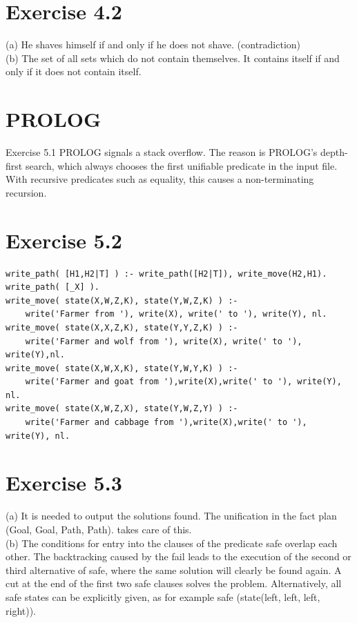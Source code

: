 \documentclass[10pt]{book}
\begin{document}
\section{Exercise 4.2}
(a) He shaves himself if and only if he does not shave. (contradiction)\\
(b) The set of all sets which do not contain themselves. It contains itself if and only if it does not contain itself.

\section{PROLOG}
Exercise 5.1 PROLOG signals a stack overflow. The reason is PROLOG's depth-first search, which always chooses the first unifiable predicate in the input file. With recursive predicates such as equality, this causes a non-terminating recursion.

\section{Exercise 5.2}
\begin{verbatim}
write_path( [H1,H2|T] ) :- write_path([H2|T]), write_move(H2,H1).
write_path( [_X] ).
write_move( state(X,W,Z,K), state(Y,W,Z,K) ) :-
    write('Farmer from '), write(X), write(' to '), write(Y), nl.
write_move( state(X,X,Z,K), state(Y,Y,Z,K) ) :-
    write('Farmer and wolf from '), write(X), write(' to '), write(Y),nl.
write_move( state(X,W,X,K), state(Y,W,Y,K) ) :-
    write('Farmer and goat from '),write(X),write(' to '), write(Y), nl.
write_move( state(X,W,Z,X), state(Y,W,Z,Y) ) :-
    write('Farmer and cabbage from '),write(X),write(' to '), write(Y), nl.
\end{verbatim}

\section{Exercise 5.3}
(a) It is needed to output the solutions found. The unification in the fact plan (Goal, Goal, Path, Path). takes care of this.\\
(b) The conditions for entry into the clauses of the predicate safe overlap each other. The backtracking caused by the fail leads to the execution of the second or third alternative of safe, where the same solution will clearly be found again. A cut at the end of the first two safe clauses solves the problem. Alternatively, all safe states can be explicitly given, as for example safe (state(left, left, left, right)).
\end{document}
